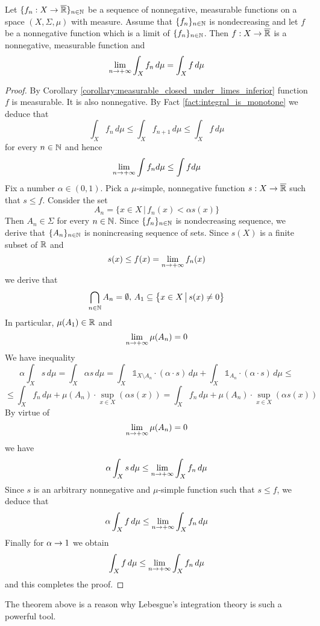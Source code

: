 \begin{theorem}\label{theorem:monotone_convergence}
Let $\{f_n:X\rightarrow \overline{{\mathbb R}}\}_{n\in {\mathbb N}}$ be a sequence of nonnegative, measurable functions on a space $(X,\Sigma,\mu)$ with measure. Assume that $\{f_n\}_{n\in {\mathbb N}}$ is nondecreasing and let $f$ be a nonnegative function which is a limit of $\{f_n\}_{n\in {\mathbb N}}$. Then $f:X\rightarrow \overline{{\mathbb R}}$ is a nonnegative, measurable function and
$$\lim_{n\rightarrow +\infty}\int_X f_n\, d\mu = \int_X f\, d\mu$$
\end{theorem}
\begin{proof}
By Corollary \ref{corollary:measurable_closed_under_limes_inferior} function $f$ is measurable. It is also nonnegative. By Fact \ref{fact:integral_is_monotone} we deduce that
$$\int_X f_n\,d\mu \leq \int_X f_{n+1}\,d\mu \leq \int_X f\, d\mu$$
for every $n\in {\mathbb N}$ and hence 
$$\lim_{n\rightarrow +\infty}\int f_n d\mu \leq \int f d\mu$$
Fix a number $\alpha \in (0,1)$. Pick a $\mu$-simple, nonnegative function $s:X\rightarrow \overline{{\mathbb R}}$ such that $s\leq f$. Consider the set
$$A_n = \big\{x\in X\,\big|\, f_n(x)< \alpha s(x)\big\}$$
Then $A_n\in \Sigma$ for every $n\in {\mathbb N}$. Since $\{f_n\}_{n\in {\mathbb N}}$ is nondecreasing sequence, we derive that $\{A_n\}_{n\in {\mathbb N}}$ is nonincreasing sequence of sets. Since $s(X)$ is a finite subset of ${\mathbb R}$ and
$$s(x)\leq f(x) = \lim_{n\rightarrow +\infty}f_n(x)$$
we derive that
$$\bigcap_{n\in {\mathbb N}}A_n = \emptyset,\,A_1\subseteq \big\{x\in X\,\big|\,s(x)\neq 0\big\}$$
In particular, $\mu(A_1) \in {\mathbb R}$ and 
$$\lim_{n\rightarrow +\infty}\mu(A_n)=0$$
We have inequality
$$\alpha  \int_Xs\,d\mu = \int_X\alpha s\,d\mu = \int_X  \mathbb{1}_{X\setminus A_n}\cdot \left(\alpha \cdot s\right)\,d\mu +  \int_X \mathbb{1}_{A_n}\cdot \left(\alpha \cdot s\right)\,d\mu \leq $$
$$\leq \int_X f_n\,d\mu + \mu(A_n)\cdot \sup_{x\in X}\left(\alpha s(x)\right) = \int_X f_n\,d\mu + \mu(A_n)\cdot \sup_{x\in X}\left(\alpha s(x)\right)$$
By virtue of
$$\lim_{n\rightarrow +\infty} \mu(A_n) = 0$$
we have
$$\alpha  \int_Xs\,d\mu \leq \lim_{n\rightarrow +\infty}\int_Xf_n\,d\mu$$
Since $s$ is an arbitrary nonnegative and $\mu$-simple function such that $s\leq f$, we deduce that
$$\alpha  \int_Xf\,d\mu \leq \lim_{n\rightarrow +\infty}\int_Xf_n\,d\mu$$
Finally for $\alpha \rightarrow 1$ we obtain
$$\int_Xf\,d\mu \leq  \lim_{n\rightarrow +\infty}\int_Xf_n\,d\mu$$
and this completes the proof.
\end{proof}
\noindent
The theorem above is a reason why Lebesgue's integration theory is such a powerful tool.

